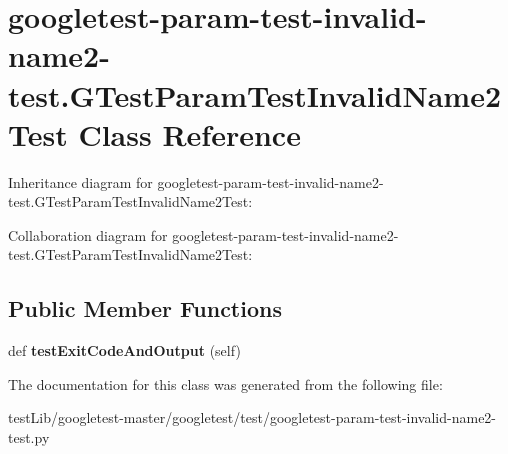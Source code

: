 \hypertarget{classgoogletest-param-test-invalid-name2-test_1_1GTestParamTestInvalidName2Test}{}\section{googletest-\/param-\/test-\/invalid-\/name2-\/test.G\+Test\+Param\+Test\+Invalid\+Name2\+Test Class Reference}
\label{classgoogletest-param-test-invalid-name2-test_1_1GTestParamTestInvalidName2Test}


Inheritance diagram for googletest-\/param-\/test-\/invalid-\/name2-\/test.G\+Test\+Param\+Test\+Invalid\+Name2\+Test\+:


Collaboration diagram for googletest-\/param-\/test-\/invalid-\/name2-\/test.G\+Test\+Param\+Test\+Invalid\+Name2\+Test\+:
\subsection*{Public Member Functions}
\begin{DoxyCompactItemize}
\item 
\mbox{\label{classgoogletest-param-test-invalid-name2-test_1_1GTestParamTestInvalidName2Test_a3fbc22a46315dc7ba10f0203349de7c7}} 
def {\bfseries test\+Exit\+Code\+And\+Output} (self)
\end{DoxyCompactItemize}


The documentation for this class was generated from the following file\+:\begin{DoxyCompactItemize}
\item 
test\+Lib/googletest-\/master/googletest/test/googletest-\/param-\/test-\/invalid-\/name2-\/test.\+py\end{DoxyCompactItemize}
